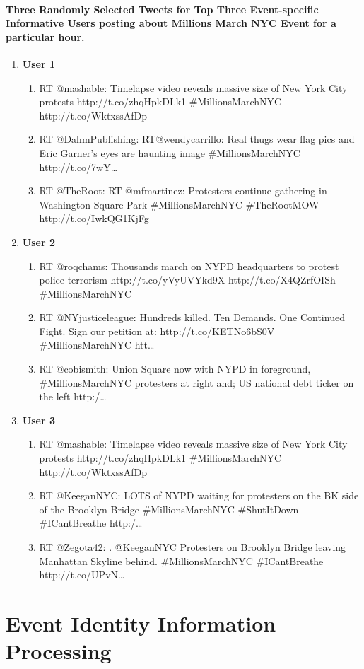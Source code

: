 \paragraph{Three Randomly Selected Tweets for Top Three Event-specific Informative Users posting about Millions March NYC Event for a particular hour.}
\begin{enumerate}
\item \textbf{User 1}
\begin{enumerate}
\item RT @mashable: Timelapse video reveals massive size of New York City protests http://t.co/zhqHpkDLk1 \#MillionsMarchNYC http://t.co/WktxssAfDp
\item RT @DahmPublishing: RT@wendycarrillo: Real thugs wear flag pics and Eric Garner's eyes are haunting image \#MillionsMarchNYC http://t.co/7wY…
\item RT @TheRoot: RT @mfmartinez: Protesters continue gathering in Washington Square Park \#MillionsMarchNYC \#TheRootMOW http://t.co/IwkQG1KjFg
\end{enumerate}

\item \textbf{User 2}
\begin{enumerate}
\item RT @roqchams: Thousands march on NYPD headquarters to protest police terrorism http://t.co/yVyUVYkd9X http://t.co/X4QZrfOISh \#MillionsMarchNYC
\item RT @NYjusticeleague: Hundreds killed. Ten Demands. One Continued Fight.  Sign our petition at: http://t.co/KETNo6bS0V \#MillionsMarchNYC htt…
\item RT @cobismith: Union Square now with NYPD in foreground, \#MillionsMarchNYC protesters at right and; US national debt ticker on the left http:/…
\end{enumerate}

\item \textbf{User 3}
\begin{enumerate}
\item RT @mashable: Timelapse video reveals massive size of New York City protests http://t.co/zhqHpkDLk1 \#MillionsMarchNYC http://t.co/WktxssAfDp
\item RT @KeeganNYC: LOTS of NYPD waiting for protesters on the BK side of the Brooklyn Bridge \#MillionsMarchNYC \#ShutItDown \#ICantBreathe http:/…
\item RT @Zegota42: . @KeeganNYC Protesters on Brooklyn Bridge leaving Manhattan Skyline behind. \#MillionsMarchNYC \#ICantBreathe http://t.co/UPvN…
\end{enumerate}

\end{enumerate}


\section{Event Identity Information Processing\label{eventidentityinformationprocessing}}


